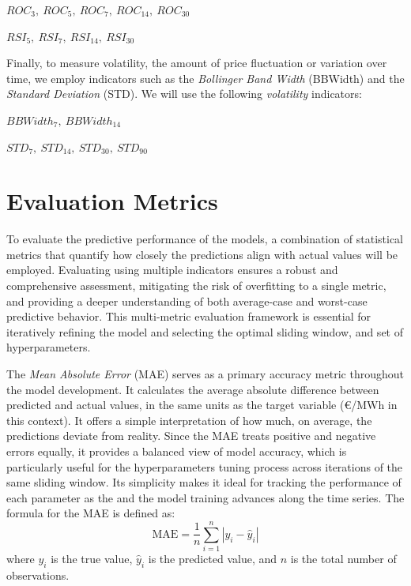 \documentclass[12pt]{report} %
\begin{document}
    $ ROC_{3},\ ROC_{5},\ ROC_{7},\ ROC_{14},\ ROC_{30} $
    
    $ RSI_{5},\ RSI_{7},\ RSI_{14},\ RSI_{30} $

Finally, to measure volatility, the amount of price fluctuation or variation over time, we employ indicators such as the \textit{Bollinger Band Width} (BBWidth) and the \textit{Standard Deviation} (STD). We will use the following \textit{volatility} indicators:

    $ BBWidth_{7},\ BBWidth_{14} $
    
    $ STD_{7},\ STD_{14},\ STD_{30},\ STD_{90} $


\section{Evaluation Metrics}

To evaluate the predictive performance of the models, a combination of statistical metrics that quantify how closely the predictions align with actual values will be employed. Evaluating using multiple indicators ensures a robust and comprehensive assessment, mitigating the risk of overfitting to a single metric, and providing a deeper understanding of both average-case and worst-case predictive behavior. This multi-metric evaluation framework is essential for iteratively refining the model and selecting the optimal sliding window, and set of hyperparameters.

The \textit{Mean Absolute Error} (MAE) serves as a primary accuracy metric throughout the model development. It calculates the average absolute difference between predicted and actual values, in the same units as the target variable (€/MWh in this context). It offers a simple interpretation of how much, on average, the predictions deviate from reality. Since the MAE treats positive and negative errors equally, it provides a balanced view of model accuracy, which is particularly useful for the hyperparameters tuning process across iterations of the same sliding window. Its simplicity makes it ideal for tracking the performance of each parameter as the and the model training advances along the time series. The formula for the MAE is defined as:
\[
\text{MAE} = \frac{1}{n} \sum_{i=1}^{n} \left| y_i - \hat{y}_i \right|
\]
where \( y_i \) is the true value, \( \hat{y}_i \) is the predicted value, and \( n \) is the total number of observations.
\end{document}
